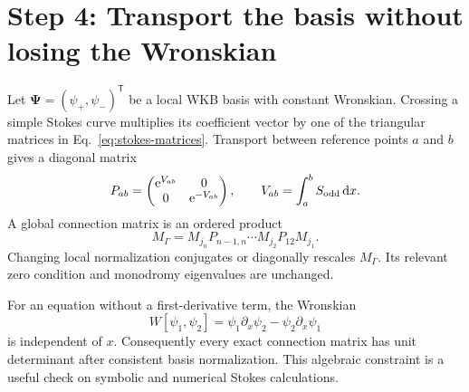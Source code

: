 \section{Step 4: Transport the basis without losing the Wronskian}
\label{app:connection-matrices}

Let $\bm\Psi=(\psi_+,\psi_-)^{\mathsf T}$ be a local WKB basis with constant
Wronskian.  Crossing a simple Stokes curve multiplies its coefficient vector by
one of the triangular matrices in Eq.~\eqref{eq:stokes-matrices}.  Transport
between reference points $a$ and $b$ gives a diagonal matrix
\begin{equation}
  P_{ab}
  =\begin{pmatrix}
  \mathrm{e}^{V_{ab}}&0\\
  0&\mathrm{e}^{-V_{ab}}
  \end{pmatrix},
  \qquad
  V_{ab}=\int_a^bS_{\mathrm{odd}}\,\mathrm{d} x .
  \label{eq:propagation-matrix}
\end{equation}
A global connection matrix is an ordered product
\begin{equation}
  M_{\Gamma}
  =M_{j_n}P_{n-1,n}\cdots M_{j_2}P_{12}M_{j_1} .
  \label{eq:global-connection-product}
\end{equation}
Changing local normalization conjugates or diagonally rescales
$M_{\Gamma}$.  Its relevant zero condition and monodromy eigenvalues are
unchanged.

For an equation without a first-derivative term, the Wronskian
\begin{equation}
  W[\psi_1,\psi_2]
  =\psi_1\partial_x\psi_2
  -\psi_2\partial_x\psi_1
  \label{eq:wronskian}
\end{equation}
is independent of $x$.  Consequently every exact connection matrix has unit
determinant after consistent basis normalization.  This algebraic constraint
is a useful check on symbolic and numerical Stokes calculations.

